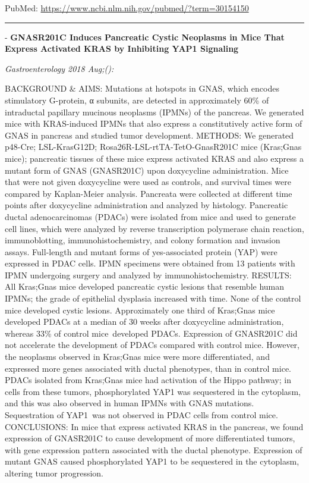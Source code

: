 \documentclass[]{article}
\begin{document}
PubMed: \url{https://www.ncbi.nlm.nih.gov/pubmed/?term=30154150}

{}

{}

\begin{center}\rule{0.5\linewidth}{\linethickness}\end{center}

 - \textbf{GNASR201C Induces Pancreatic Cystic Neoplasms in Mice That
Express Activated KRAS by Inhibiting YAP1 Signaling}

\emph{Gastroenterology 2018 Aug;():}

BACKGROUND \& AIMS: Mutations at hotspots in GNAS, which encodes
stimulatory G-protein, α subunits, are detected in approximately 60\% of
intraductal papillary mucinous neoplasms (IPMNs) of the pancreas. We
generated mice with KRAS-induced IPMNs that also express a
constitutively active form of GNAS in pancreas and studied tumor
development. METHODS: We generated p48-Cre; LSL-KrasG12D;
Rosa26R-LSL-rtTA-TetO-GnasR201C mice (Kras;Gnas mice); pancreatic
tissues of these mice express activated KRAS and also express a mutant
form of GNAS (GNASR201C) upon doxycycline administration. Mice that were
not given doxycycline were used as controls, and survival times were
compared by Kaplan-Meier analysis. Pancreata were collected at different
time points after doxycycline administration and analyzed by histology.
Pancreatic ductal adenocarcinomas (PDACs) were isolated from mice and
used to generate cell lines, which were analyzed by reverse
transcription polymerase chain reaction, immunoblotting,
immunohistochemistry, and colony formation and invasion assays.
Full-length and mutant forms of yes-associated protein (YAP) were
expressed in PDAC cells. IPMN specimens were obtained from 13 patients
with IPMN undergoing surgery and analyzed by immunohistochemistry.
RESULTS: All Kras;Gnas mice developed pancreatic cystic lesions that
resemble human IPMNs; the grade of epithelial dysplasia increased with
time. None of the control mice developed cystic lesions. Approximately
one third of Kras;Gnas mice developed PDACs at a median of 30 weeks
after doxycycline administration, whereas 33\% of control mice~developed
PDACs. Expression of GNASR201C did not accelerate the development of
PDACs compared with control mice. However, the neoplasms observed in
Kras;Gnas mice were more differentiated, and expressed more genes
associated with ductal phenotypes, than in control mice. PDACs isolated
from Kras;Gnas mice had activation of the Hippo pathway; in cells from
these tumors, phosphorylated YAP1 was sequestered in the cytoplasm, and
this was also observed in human IPMNs with GNAS mutations. Sequestration
of YAP1~was not observed in PDAC cells from control mice. CONCLUSIONS:
In mice that express activated KRAS in the pancreas, we found expression
of GNASR201C to cause development of more differentiated tumors, with
gene expression pattern associated with the ductal phenotype. Expression
of mutant GNAS caused phosphorylated YAP1 to be sequestered in the
cytoplasm, altering tumor progression.
\end{document}
